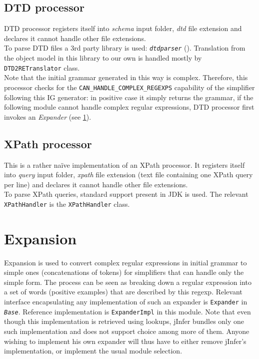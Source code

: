 \documentclass[a4paper,10pt,oneside]{article}
\newcommand{\code}[1]{\texttt{#1}}
\newcommand{\jmodule}[1]{\texttt{\textit{#1}}}
\begin{document}
\subsection{DTD processor}

DTD processor registers itself into \emph{schema} input folder, \emph{dtd} file extension and declares it cannot handle other file extensions.\\
To parse DTD files a 3rd party library is used: \jmodule{dtdparser} (\cite{dtdparser}).
Translation from the object model in this library to our own is handled mostly by \code{DTD2RETranslator} class.\\
Note that the initial grammar generated in this way is complex. Therefore, this processor checks for the \code{CAN\_HANDLE\_COMPLEX\_REGEXPS} capability of the simplifier following this IG generator: in positive case it simply returns the grammar, if the following module cannot handle complex regular expressions, DTD processor first invokes an \emph{Expander} (see \ref{section-expansion}).

\subsection{XPath processor}

This is a rather na\"{i}ve implementation of an XPath processor. It registers itself into \emph{query} input folder, \emph{xpath} file extension (text file containing one XPath query per line) and declares it cannot handle other file extensions.\\
To parse XPath queries, standard support present in JDK is used. The relevant \code{XPathHandler} is the \code{XPathHandler} class.\\

\section{Expansion} \label{section-expansion}

Expansion is used to convert complex regular expressions in initial grammar to simple ones (concatenations of tokens) for simplifiers that can handle only the simple form. The process can be seen as breaking down a regular expression into a set of words (positive examples) that are described by this regexp. Relevant interface encapsulating any implementation of such an expander is \code{Expander} in \jmodule{Base}. Reference implementation is \code{ExpanderImpl} in this module. Note that even though this implementation is retrieved using lookups, jInfer bundles only one such implementation and does not support choice among more of them. Anyone wishing to implement his own expander will thus have to either remove jInfer's implementation, or implement the usual module selection. %
\end{document}
